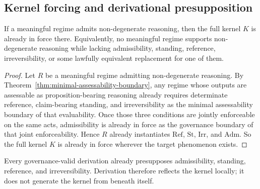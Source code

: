 \subsection{Kernel forcing and derivational presupposition}

\begin{theorem}
\label{thm:kernel-forcing}
If a meaningful regime admits non-degenerate reasoning, then the full kernel $K$ is already in force there. Equivalently, no meaningful regime supports non-degenerate reasoning while lacking admissibility, standing, reference, irreversibility, or some lawfully equivalent replacement for one of them.
\end{theorem}

\begin{proof}
Let $R$ be a meaningful regime admitting non-degenerate reasoning. By Theorem~\ref{thm:minimal-assessability-boundary}, any regime whose outputs are assessable as proposition-bearing reasoning already requires determinate reference, claim-bearing standing, and irreversibility as the minimal assessability boundary of that evaluability. Once those three conditions are jointly enforceable on the same acts, admissibility is already in force as the governance boundary of that joint enforceability. Hence $R$ already instantiates $\mathrm{Ref}$, $\mathrm{St}$, $\mathrm{Irr}$, and $\mathrm{Adm}$. So the full kernel $K$ is already in force wherever the target phenomenon exists.\cite{MaleyFoundationalClosure}
\end{proof}

\begin{proposition}
\label{prop:derivation-presupposes-kernel}
Every governance-valid derivation already presupposes admissibility, standing, reference, and irreversibility. Derivation therefore reflects the kernel locally; it does not generate the kernel from beneath itself.
\end{proposition}

